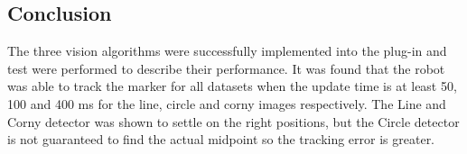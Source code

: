 \subsection{Conclusion}
The three vision algorithms were successfully implemented into the plug-in and test were performed to describe their performance.
It was found that the robot was able to track the marker for all datasets when the update time is at least 50, 100 and 400 ms for the line, circle and corny images respectively.
The Line and Corny detector was shown to settle on the right positions, but the Circle detector is not guaranteed to find the actual midpoint so the tracking error is greater.


